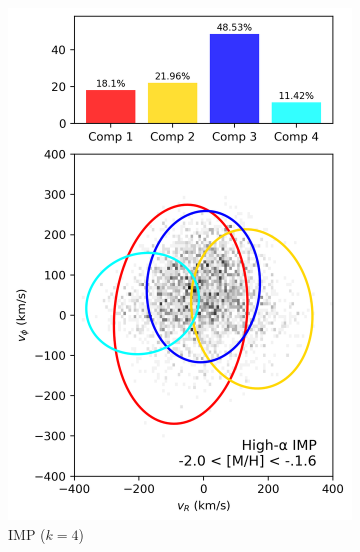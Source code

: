 \documentclass[a4paper,12pt]{article}
\begin{document}
\begin{figure}[ht]
\begin{subfigure}{0.245\linewidth}
    \includegraphics[width=\linewidth]{../figures/gmm_imp_high_alpha_k4.png}
    \caption{IMP ($k{=}4$)}
    \label{fig:imp_hi}
  \end{subfigure}\hfill
  \begin{subfigure}{0.245\linewidth}

\end{subfigure}
\end{figure}
\end{document}
